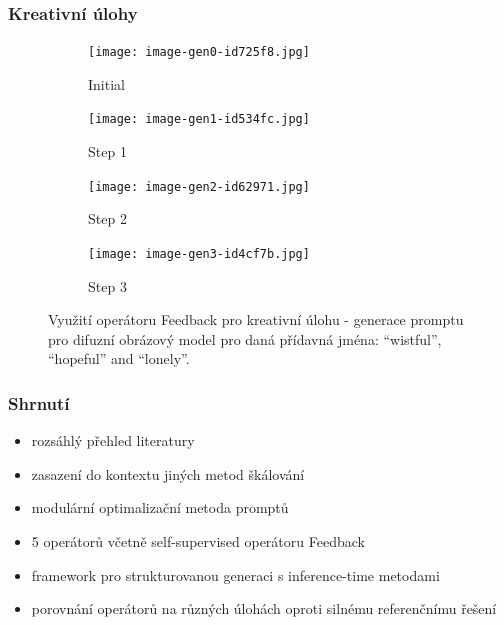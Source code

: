 \documentclass[aspectratio=169]{beamer}
\begin{document}
\begin{frame}
	\frametitle{Kreativní úlohy}
	\begin{figure}[htbp]
    \centering

    \begin{subfigure}{0.24\linewidth}
        \texttt{[image: image-gen0-id725f8.jpg]}
        \caption{Initial}
    \end{subfigure}
    \hfill
    \begin{subfigure}{0.24\linewidth}
        \texttt{[image: image-gen1-id534fc.jpg]}
        \caption{Step 1}
    \end{subfigure}
    \hfill
    \begin{subfigure}{0.24\linewidth}
        \texttt{[image: image-gen2-id62971.jpg]}
        \caption{Step 2}
    \end{subfigure}
    \hfill
    \begin{subfigure}{0.24\linewidth}
        \texttt{[image: image-gen3-id4cf7b.jpg]}
        \caption{Step 3}
    \end{subfigure}

    \caption{Využití operátoru Feedback pro kreativní úlohu - generace promptu pro difuzní obrázový model pro daná přídavná jména: ``wistful'', ``hopeful'' and ``lonely''.}
    \label{fig:wistful}
\end{figure}
\end{frame}

\begin{frame}
	\frametitle{Shrnutí}
	\begin{itemize}
		\item rozsáhlý přehled literatury
		\item zasazení do kontextu jiných metod škálování
		\item modulární optimalizační metoda promptů
		\item 5 operátorů včetně self-supervised operátoru Feedback
		\item framework pro strukturovanou generaci s inference-time metodami
		\item porovnání operátorů na různých úlohách oproti silnému referenčnímu řešení
	\end{itemize}
\end{frame}
\end{document}
